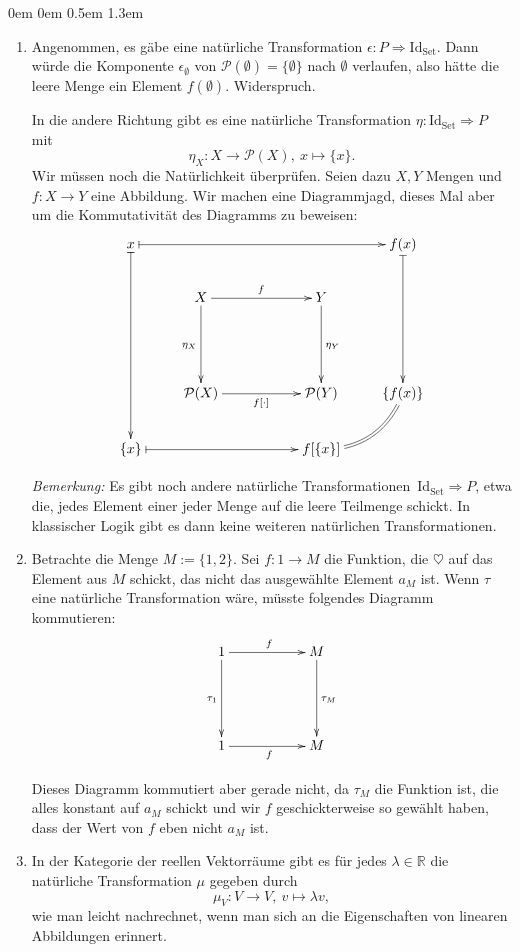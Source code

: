 \documentclass[a4paper,ngerman]{scrartcl}
\theoremstyle{definition}
\theoremstyle{plain}
\theoremstyle{remark}
\newcommand{\R}{\mathbb{R}}
\newcommand{\Set}{\mathrm{Set}}
\newcommand{\Id}{\mathrm{Id}}
\newcommand{\Pset}{\mathcal{P}}
\begin{document}
\begin{list}{}{0em \leftmargin0em \itemindent0.5em \itemsep 1.3em}
\begin{enumerate}
\item Angenommen, es gäbe eine natürliche Transformation $\epsilon : P \Rightarrow \Id_{\Set}$. Dann würde die Komponente $\epsilon_{\emptyset}$ von $\Pset(\emptyset) = \{ \emptyset \}$ nach $\emptyset$ verlaufen, also hätte die leere Menge ein Element $f(\emptyset)$. Widerspruch.

In die andere Richtung gibt es eine natürliche Transformation $\eta : \Id_{\Set} \Rightarrow P$ mit
\[ \eta_X : X \to \mathcal{P}(X),\ x \mapsto \{x\}. \]
Wir müssen noch die Natürlichkeit überprüfen. Seien dazu $X, Y$ Mengen und $f : X \to Y$ eine Abbildung. Wir machen eine Diagrammjagd, dieses Mal aber um die Kommutativität des Diagramms zu beweisen:
\[ \xymatrixcolsep{2pc}\xymatrix{
  x  \ar@{|->}[dddd] \ar@{|->}[rrrr] &&&& f(x) \ar@{|->}[ddd] \\
  & X \ar[dd]_{\eta_{X}} \ar[rr]^{f} && Y \ar[dd]^{\eta_{Y}} \\
  \\
  & \Pset(X) \ar[rr]_{f[\cdot]} && \Pset(Y) & \{f(x)\} \ar@{=}@/^1pc/[dl] \\
  \{ x \} \ar@{|->}[rrr] &&& f[\{ x \}]
} \]

\emph{Bemerkung:} Es gibt noch andere natürliche Transformationen~$\Id_\Set
\Rightarrow P$, etwa die, jedes Element einer jeder Menge auf die leere
Teilmenge schickt. In klassischer Logik gibt es dann keine weiteren natürlichen
Transformationen.

\item Betrachte die Menge $M := \{1, 2\}$. Sei $f : 1 \to M$ die Funktion, die
$\heartsuit$ auf das Element aus $M$ schickt, das nicht das ausgewählte Element $a_M$ ist.
Wenn $\tau$ eine natürliche Transformation wäre, müsste folgendes Diagramm kommutieren:
\[ \xymatrixcolsep{2pc}\xymatrix{
  1 \ar[dd]_{\tau_{1}} \ar[rr]^{f} && M \ar[dd]^{\tau_{M}} \\
  \\
  1 \ar[rr]_{f} && M
} \]

Dieses Diagramm kommutiert aber gerade nicht, da $\tau_{M}$ die Funktion ist, die
alles konstant auf $a_M$ schickt und wir $f$ geschickterweise so gewählt haben, dass der Wert von $f$ eben nicht $a_M$ ist.


\item In der Kategorie der reellen Vektorräume gibt es für jedes $\lambda \in \R$ die
natürliche Transformation $\mu$ gegeben durch
\[ \mu_{V} : V \to V,\ v \mapsto \lambda v, \]
wie man leicht nachrechnet, wenn man sich an die Eigenschaften von linearen Abbildungen
erinnert.


\end{enumerate}
\end{list}
\end{document}
